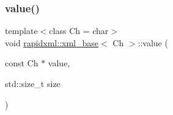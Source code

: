 \mbox{\label{classrapidxml_1_1xml__base_a3b183c2db7022a6d30494dd2f0ac11e9}} 
\subsubsection{\texorpdfstring{value()}{value()}\hspace{0.1cm}{\footnotesize\ttfamily [2/3]}}
{\footnotesize\ttfamily template$<$class Ch  = char$>$ \\
void \mbox{\hyperlink{classrapidxml_1_1xml__base}{rapidxml\+::xml\+\_\+base}}$<$ Ch $>$\+::value (\begin{DoxyParamCaption}\item[{const Ch $\ast$}]{value,  }\item[{std\+::size\+\_\+t}]{size }\end{DoxyParamCaption})\hspace{0.3cm}{\ttfamily [inline]}}


